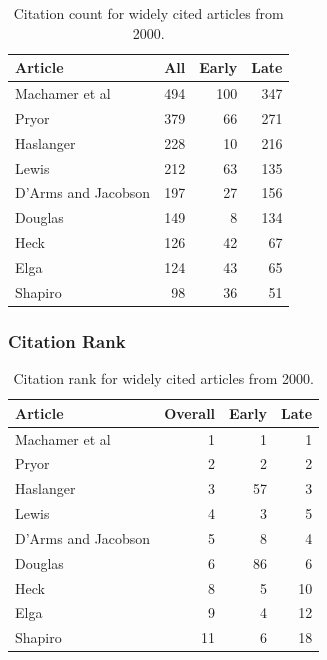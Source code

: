 \documentclass[
  10pt,
  letterpaper,
  DIV=11,
  numbers=noendperiod,
  twoside]{scrartcl}
\begin{document}
\begin{longtable}[]{@{}lrrr@{}}

\caption{\label{tbl-citation-count-2000}Citation count for widely cited
articles from 2000.}

\tabularnewline

\toprule\noalign{}
Article & All & Early & Late \\
\midrule\noalign{}
\endhead
\bottomrule\noalign{}
\endlastfoot
Machamer et al & 494 & 100 & 347 \\
Pryor & 379 & 66 & 271 \\
Haslanger & 228 & 10 & 216 \\
Lewis & 212 & 63 & 135 \\
D'Arms and Jacobson & 197 & 27 & 156 \\
Douglas & 149 & 8 & 134 \\
Heck & 126 & 42 & 67 \\
Elga & 124 & 43 & 65 \\
Shapiro & 98 & 36 & 51 \\

\end{longtable}

\subsubsection*{Citation Rank}\label{citation-rank-24}

\begin{longtable}[]{@{}lrrr@{}}

\caption{\label{tbl-citation-rank-2000}Citation rank for widely cited
articles from 2000.}

\tabularnewline

\toprule\noalign{}
Article & Overall & Early & Late \\
\midrule\noalign{}
\endhead
\bottomrule\noalign{}
\endlastfoot
Machamer et al & 1 & 1 & 1 \\
Pryor & 2 & 2 & 2 \\
Haslanger & 3 & 57 & 3 \\
Lewis & 4 & 3 & 5 \\
D'Arms and Jacobson & 5 & 8 & 4 \\
Douglas & 6 & 86 & 6 \\
Heck & 8 & 5 & 10 \\
Elga & 9 & 4 & 12 \\
Shapiro & 11 & 6 & 18 \\

\end{longtable}
\end{document}
